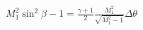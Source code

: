 \documentclass[10pt]{article}
\begin{document}
\begin{align*}M_{1}^{2} \sin^2 \beta - 1
=
\frac{\gamma+1}{2} \frac{ M_{1}^{2} }{ \sqrt{M_{1}^{2}-1}}
\Delta \theta
\end{align*}
\end{document}
